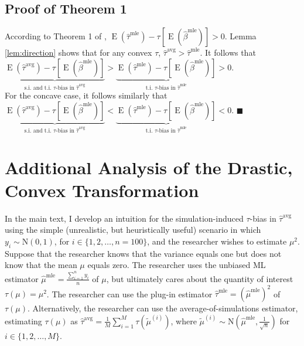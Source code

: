 \documentclass[12pt]{article}
\newenvironment{proof}[1][Proof]{\begin{trivlist}
\item[\hskip \labelsep {\bfseries #1}]}{\end{trivlist}}
\DeclareMathOperator*{\E}{\text{E}}
\begin{document}
\subsection{Proof of Theorem 1}

\begin{proof}
According to Theorem 1 of \citet[p.\@ 405]{Rainey2017}, $\E\left( \hat{\tau}^\text{mle}\right) -  \tau \left[\E\left( \hat{\beta}^\text{mle} \right) \right] > 0$.
Lemma \ref{lem:direction} shows that for any convex $\tau$, $\hat{\tau}^{\text{avg}} > \hat{\tau}^\text{mle}$.
It follows that $\underbrace{\E\left( \hat{\tau}^\text{avg}\right) - \tau \left[\E\left( \hat{\beta}^\text{mle} \right) \right]}_{\text{s.i. and t.i. } \tau\text{-bias in }\hat{\tau}^{\text{avg}}} > \underbrace{\E\left( \hat{\tau}^\text{mle}\right) -  \tau \left[\E\left( \hat{\beta}^\text{mle} \right) \right]}_{\text{t.i. } \tau\text{-bias in }\hat{\tau}^{\text{mle}}} > 0$.\\

\noindent For the concave case, it follows similarly that $\underbrace{\E\left( \hat{\tau}^\text{avg}\right) - \tau \left[\E\left( \hat{\beta}^\text{mle} \right) \right]}_{\text{s.i. and t.i. } \tau\text{-bias in }\hat{\tau}^{\text{avg}}} < \underbrace{\E\left( \hat{\tau}^\text{mle}\right) -  \tau \left[\E\left( \hat{\beta}^\text{mle} \right) \right]}_{\text{t.i. } \tau\text{-bias in }\hat{\tau}^{\text{mle}}} < 0$.
 $\blacksquare$
\end{proof}

\section{Additional Analysis of the Drastic, Convex Transformation}\label{appendix:drastic-analysis}

\onehalfspace

In the main text, I develop an intuition for the simulation-induced $\tau$-bias in $\hat{\tau}^\text{avg}$ using the simple (unrealistic, but heuristically useful) scenario in which $y_i \sim \text{N}(0, 1)$, for $i \in \{1, 2, \ldots, n = 100\}$, and the researcher wishes to estimate $\mu^2$. Suppose that the researcher knows that the variance equals one but does not know that the mean $\mu$ equals zero. The researcher uses the unbiased ML estimator $\hat{\mu}^\text{mle} = \frac{\sum_{i=1}^n y_i}{n}$ of $\mu$, but ultimately cares about the quantity of interest $\tau(\mu) = \mu^2$. The researcher can use the plug-in estimator $\hat{\tau}^\text{mle} = \left( \hat{\mu}^\text{mle} \right) ^2$ of $\tau(\mu)$. Alternatively, the researcher can use the average-of-simulations estimator, estimating $\tau(\mu)$ as $\hat{\tau}^\text{avg} = \frac{1}{M} \sum_{i = 1}^M \tau \left( \tilde{\mu}^{(i)} \right)$, where $\tilde{\mu}^{(i)} \sim \text{N} \left( \hat{\mu}^\text{mle}, \frac{1}{\sqrt{n}} \right)$ for $i \in \{1, 2,\ldots, M\}$.
\end{document}

